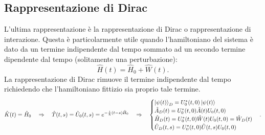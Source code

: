 \subsection{Rappresentazione di Dirac}
L'ultima rappresentazione è la rappresentazione di Dirac o rappresentazione di interazione. Questa è particolarmente utile quando l'hamiltoniano del sistema è dato da un termine indipendente dal tempo sommato ad un secondo termine dipendente dal tempo (solitamente una perturbazione):
\begin{equation*}
    \hat H(t)=\hat H_0+\hat W(t).
\end{equation*}
La rappresentazione di Dirac rimuove il termine indipendente dal tempo richiedendo che l'hamiltoniano fittizio sia proprio tale termine.
\begin{equation*}
    \hat K(t)=\hat H_0\quad\Rightarrow\quad\hat T(t,s) =\hat U_0(t,s)= e^{-\frac{i}{\hslash}(t-s)\hat H_0}\quad\Rightarrow\quad
    \begin{cases}
        \ket{\psi(t)}_D=U_0^*(t,0)\ket{\psi(t)}\\
        \hat A_D(t)=U_0^*(t,0)\hat A(t)U_0(t,0)\\
        \hat H_D(t)=U_0^*(t,0)\hat W(t)U_0(t,0)=\hat W_D(t)\\
        \hat U_D(t,s)=U_0^*(t,0)\hat U(t,s)U_0(t,0)
    \end{cases}.
\end{equation*}